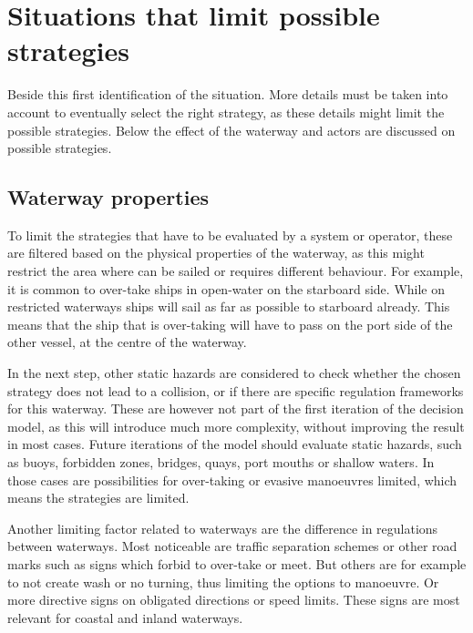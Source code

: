 \clearpage


\section{Situations that limit possible strategies}
Beside this first identification of the situation. More details must be taken into account to eventually select the right strategy, as these details might limit the possible strategies. Below the effect of the waterway and actors are discussed on possible strategies.

\subsection{Waterway properties}
To limit the strategies that have to be evaluated by a system or operator, these are filtered based on the physical properties of the waterway, as this might restrict the area where can be sailed or requires different behaviour. For example, it is common to over-take ships in open-water on the starboard side. While on restricted waterways ships will sail as far as possible to starboard already. This means that the ship that is over-taking will have to pass on the port side of the other vessel, at the centre of the waterway.

In the next step, other static hazards are considered to check whether the chosen strategy does not lead to a collision, or if there are specific regulation frameworks for this waterway. These are however not part of the first iteration of the decision model, as this will introduce much more complexity, without improving the result in most cases. Future iterations of the model should evaluate static hazards, such as buoys, forbidden zones, bridges, quays, port mouths or shallow waters. In those cases are possibilities for over-taking or evasive manoeuvres limited, which means the strategies are limited.

Another limiting factor related to waterways are the difference in regulations between waterways. Most noticeable are traffic separation schemes or other road marks such as signs which forbid to over-take or meet. But others are for example to not create wash or no turning, thus limiting the options to manoeuvre. Or more directive signs on obligated directions or speed limits. These signs are most relevant for coastal and inland waterways.

